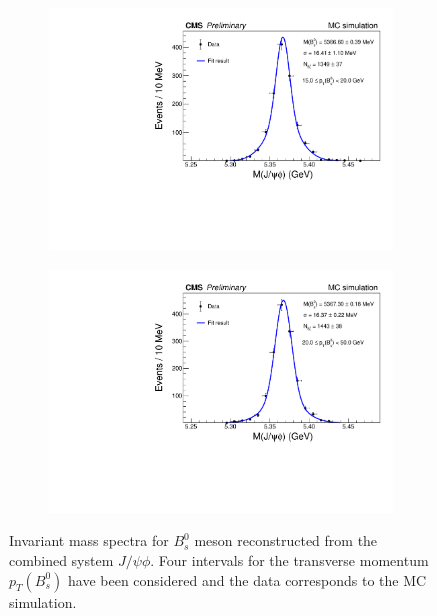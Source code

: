 \begin{figure}
\begin{subfigure}[b]{0.475\textwidth}
		\includegraphics[width=\textwidth]{MainContent/Figs/mass/mass_BsFitMC_best1_ptbins_15_20.PDF}
		\caption{}
	\end{subfigure}
	\hfill
	\begin{subfigure}[b]{0.475\textwidth}
		\centering
		\includegraphics[width=\textwidth]{MainContent/Figs/mass/mass_BsFitMC_best1_ptbins_20_50.PDF}
		\caption{}%
	\end{subfigure}
	\caption{Invariant mass spectra for $B^0_s$ meson reconstructed from the combined system $J/\psi \phi$. Four intervals for the transverse momentum $p_T(B^0_s)$ have been considered and the data corresponds to the MC simulation.}
	\label{fig:massMC_ptbins}
\end{figure}



